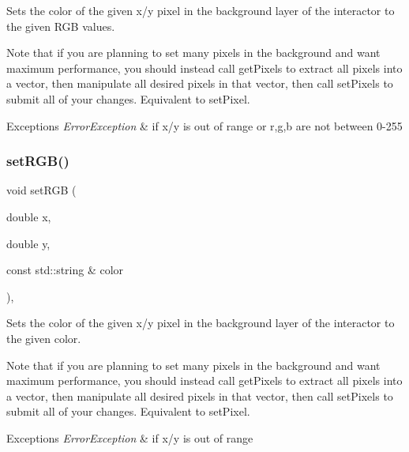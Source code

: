 Sets the color of the given x/y pixel in the background layer of the interactor to the given R\+GB values. 

Note that if you are planning to set many pixels in the background and want maximum performance, you should instead call get\+Pixels to extract all pixels into a vector, then manipulate all desired pixels in that vector, then call set\+Pixels to submit all of your changes. Equivalent to set\+Pixel.


\begin{DoxyExceptions}{Exceptions}
{\em Error\+Exception} & if x/y is out of range or r,g,b are not between 0-\/255 \\
\hline
\end{DoxyExceptions}
\mbox{\label{classsgl_1_1GDrawingSurface_ae9a228792d4bb4b628350f39eaa3ad12}} 
\subsubsection{\texorpdfstring{set\+R\+G\+B()}{setRGB()}\hspace{0.1cm}{\footnotesize\ttfamily [3/3]}}
{\footnotesize\ttfamily void set\+R\+GB (\begin{DoxyParamCaption}\item[{double}]{x,  }\item[{double}]{y,  }\item[{const std\+::string \&}]{color }\end{DoxyParamCaption})\hspace{0.3cm}{\ttfamily [virtual]}, {\ttfamily [inherited]}}



Sets the color of the given x/y pixel in the background layer of the interactor to the given color. 

Note that if you are planning to set many pixels in the background and want maximum performance, you should instead call get\+Pixels to extract all pixels into a vector, then manipulate all desired pixels in that vector, then call set\+Pixels to submit all of your changes. Equivalent to set\+Pixel.


\begin{DoxyExceptions}{Exceptions}
{\em Error\+Exception} & if x/y is out of range \\
\hline
\end{DoxyExceptions}
\mbox{\label{classsgl_1_1GWindow_aca25d49481f9bf5fc8f7df4c086c4ce7}} 
